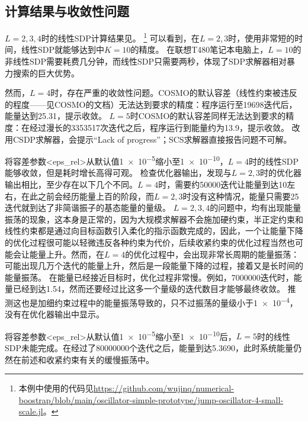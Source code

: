 \documentclass[oneside]{fduthesis}
\def\texttt#1{<#1>}%
\begin{document}
\subsection{计算结果与收敛性问题}\label{sec:convergence-problem}



$L = 2, 3, 4$时的线性SDP计算结果见。%
\footnote{本例中使用的代码见\url{https://github.com/wujinq/numerical-boostrap/blob/main/oscillator-simple-prototype/jump-oscillator-4-small-scale.jl}。}%
可以看到，在$L=2, 3$时，使用非常短的时间，线性SDP就能够达到中$K=10$的精度。
在联想T480笔记本电脑上，$L=10$的非线性SDP需要耗费几分钟，而线性SDP只需要两秒，体现了SDP求解器相对暴力搜索的巨大优势。

然而，$L=4$时，存在严重的收敛性问题。COSMO的默认容差（线性约束被违反的程度——见COSMO的文档\parencite{cosmo-method}）无法达到要求的精度：程序运行至19698迭代后，能量达到25.31，提示收敛。
$L=5$时COSMO的默认容差同样无法达到要求的精度：在经过漫长的3353517次迭代之后，程序运行到能量约为13.9，提示收敛。
改用CSDP求解器，会提示“Lack of progress”；SCS求解器直接报告问题不可解。

将容差参数\texttt{eps\_rel}从默认值\num{1e-5}缩小至\num{1e-10}，$L=4$时的线性SDP能够收敛，但是耗时增长高得可观。
检查优化器输出，发现与$L=2, 3$时的优化器输出相比，至少存在以下几个不同。$L=4$时，需要约50000迭代让能量到达10左右，在此之前会经历能量上百的阶段，而$L=2, 3$时没有这种情况，能量只需要25迭代就到达了非简谐振子的基态能量的量级。
$L=2, 3, 4$的问题中，均有出现能量振荡的现象，这本身是正常的，因为大规模求解器不会施加硬约束，半正定约束和线性约束都是通过向目标函数引入柔化的指示函数完成的\cite{cosmo-method}，因此，一个让能量下降的优化过程很可能以轻微违反各种约束为代价，后续收紧约束的优化过程当然也可能会让能量上升。然而，在$L=4$的优化过程中，会出现非常长周期的能量振荡：可能出现几万个迭代的能量上升，然后是一段能量下降的过程，接着又是长时间的能量振荡。
在能量已经接近目标时，优化过程非常慢。例如，7000000迭代时，能量已经到达1.54，然而还要经过比这多一个量级的迭代数目才能够最终收敛。
推测这也是加细约束过程中的能量振荡导致的，只不过振荡的量级小于\num{1e-4}，没有在优化器输出中显示。

将容差参数\texttt{eps\_rel}从默认值\num{1e-5}缩小至\num{1e-10}后，$L=5$时的线性SDP未能完成。在经过了80000000个迭代之后，能量到达5.3690，此时系统能量仍然在前述和收紧约束有关的缓慢振荡中。
\end{document}
